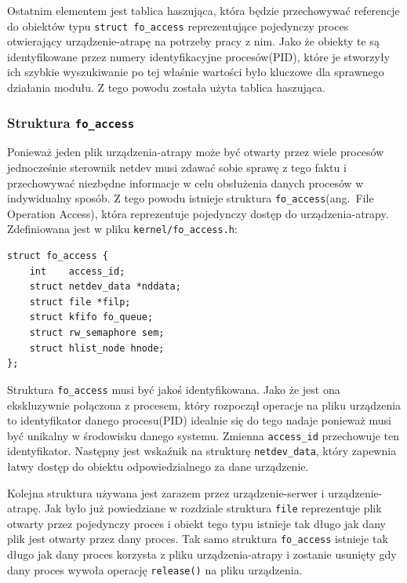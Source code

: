 \documentclass[11pt]{scrartcl}
\begin{document}
Ostatnim elementem jest tablica haszująca, która będzie przechowywać referencje do obiektów typu \texttt{struct fo\_access} reprezentujące pojedynczy proces otwierający urządzenie-atrapę na potrzeby pracy z nim.  Jako że obiekty te są identyfikowane przez numery identyfikacyjne procesów(PID), które je stworzyły ich szybkie wyszukiwanie po tej właśnie wartości było kluczowe dla sprawnego działania modułu. Z tego powodu została użyta tablica haszująca.

\subsubsection{Struktura \texttt{\large{fo\_access}}}

Ponieważ jeden plik urządzenia-atrapy może być otwarty przez wiele procesów jednocześnie sterownik netdev musi zdawać sobie sprawę z tego faktu i przechowywać niezbędne informacje w celu obsłużenia danych procesów w indywidualny sposób. Z tego powodu istnieje struktura \texttt{fo\_access}(ang.\ File Operation Access), która reprezentuje pojedynczy dostęp do urządzenia-atrapy. Zdefiniowana jest w pliku \texttt{kernel/fo\_access.h}:

\begin{verbatim}
struct fo_access {
    int    access_id;
    struct netdev_data *nddata;
    struct file *filp;
    struct kfifo fo_queue;
    struct rw_semaphore sem;
    struct hlist_node hnode;
};
\end{verbatim}

Struktura \texttt{fo\_access} musi być jakoś identyfikowana. Jako że jest ona ekskluzywnie połączona z procesem, który rozpoczął operacje na pliku urządzenia to identyfikator danego procesu(PID) idealnie się do tego nadaje ponieważ musi być unikalny w środowisku danego systemu.  Zmienna \texttt{access\_id} przechowuje ten identyfikator. Następny jest wskaźnik na strukturę \texttt{netdev\_data}, który zapewnia łatwy dostęp do obiektu odpowiedzialnego za dane urządzenie.

Kolejna struktura używana jest zarazem przez urządzenie-serwer i urządzenie-atrapę. Jak było już powiedziane w rozdziale  struktura \texttt{file} reprezentuje plik otwarty przez pojedynczy proces i obiekt tego typu istnieje tak długo jak dany plik jest otwarty przez dany proces. Tak samo struktura \texttt{fo\_access} istnieje tak długo jak dany proces korzysta z pliku urządzenia-atrapy i zostanie usunięty gdy dany proces wywoła operację \texttt{release()} na pliku urządzenia.
\end{document}
